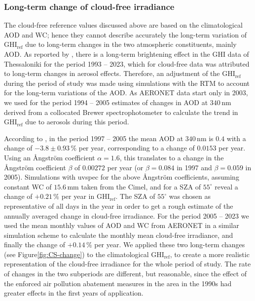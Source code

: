 \documentclass[preprint, 5p,
authoryear]{elsarticle} %
\begin{document}
\hypertarget{long-term-change-of-cloud-free-irradiance}{%
\subsubsection{Long-term change of cloud-free
irradiance}\label{long-term-change-of-cloud-free-irradiance}}

The cloud-free reference values discussed above are based on the
climatological AOD and WC; hence they cannot describe accurately the
long-term variation of \(\text{GHI}_\text{ref}\) due to long-term
changes in the two atmospheric constituents, mainly AOD. As reported by
\citet{Natsis2023}, there is a long-term brightening effect in the GHI
data of Thessaloniki for the period 1993 -- 2023, which for cloud-free
data was attributed to long-term changes in aerosol effects. Therefore,
an adjustment of the \(\text{GHI}_\text{ref}\) during the period of
study was made using simulations with the RTM to account for the
long-term variations of the AOD. As AERONET data start only in 2003, we
used for the period 1994 -- 2005 estimates of changes in AOD at
\(340\,\text{nm}\) derived from a collocated Brewer spectrophotometer
\citep{Kazadzis2007} to calculate the trend in \(\text{GHI}_\text{ref}\)
due to aerosols during this period.

According to \citet{Kazadzis2007}, in the period 1997 -- 2005 the mean
AOD at \(340\,\text{nm}\) is \(0.4\) with a change of
\(-3.8\pm0.93\,\%\) per year, corresponding to a change of \(0.0153\)
per year. Using an Ångström coefficient \(\alpha = 1.6\), this
translates to a change in the Ångström coefficient \(\beta\) of
\(0.00272\) per year (or \(\beta=0.084\) in 1997 and \(\beta=0.059\) in
2005). Simulations with uvspec for the above Ångström coefficients,
assuming constant WC of \(15.6\,\text{mm}\) taken from the Cimel, and
for a SZA of \(55^\circ\) reveal a change of \(+0.21\,\%\) per year in
\(\text{GHI}_\text{ref}\). The SZA of \(55^\circ\) was chosen as
representative of all days in the year in order to get a rough estimate
of the annually averaged change in cloud-free irradiance. For the period
2005 -- 2023 we used the mean monthly values of AOD and WC from AERONET
in a similar simulation scheme to calculate the monthly mean cloud-free
irradiance, and finally the change of \(+0.14\,\%\) per year. We applied
these two long-term changes (see
Figure\nobreakspace{}\ref{fig:CS-change}) to the climatological
\(\text{GHI}_\text{ref}\), to create a more realistic representation of
the cloud-free irradiance for the whole period of study. The rate of
changes in the two subperiods are different, but reasonable, since the
effect of the enforced air pollution abatement measures in the area in
the 1990s had greater effects in the first years of application.
\end{document}
